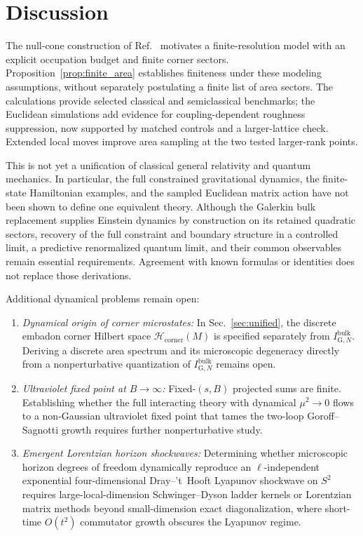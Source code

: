 \documentclass[onecolumn,11pt,aps,prd,amsmath,amssymb,nofootinbib,floatfix]{revtex4-2}
\newcommand{\calH}{\mathcal{H}}
\begin{document}
\section{Discussion}\label{sec:discussion}

The null-cone construction of Ref.~\cite{Chandrasekaran2026} motivates a finite-resolution model with an explicit occupation budget and finite corner sectors. Proposition~\ref{prop:finite_area} establishes finiteness under these modeling assumptions, without separately postulating a finite list of area sectors. The calculations provide selected classical and semiclassical benchmarks; the Euclidean simulations add evidence for coupling-dependent roughness suppression, now supported by matched controls and a larger-lattice check. Extended local moves improve area sampling at the two tested larger-rank points.

This is not yet a unification of classical general relativity and quantum mechanics. In particular, the full constrained gravitational dynamics, the finite-state Hamiltonian examples, and the sampled Euclidean matrix action have not been shown to define one equivalent theory. Although the Galerkin bulk replacement supplies Einstein dynamics by construction on its retained quadratic sectors, recovery of the full constraint and boundary structure in a controlled limit, a predictive renormalized quantum limit, and their common observables remain essential requirements. Agreement with known formulas or identities does not replace those derivations.

Additional dynamical problems remain open:
\begin{enumerate}
\item \emph{Dynamical origin of corner microstates:} In Sec.~\ref{sec:unified}, the discrete embadon corner Hilbert space $\calH_{\mathrm{corner}}(M)$ is specified separately from $I_{\mathrm{G},N}^{\mathrm{bulk}}$. Deriving a discrete area spectrum and its microscopic degeneracy directly from a nonperturbative quantization of $I_{\mathrm{G},N}^{\mathrm{bulk}}$ remains open.
\item \emph{Ultraviolet fixed point at $B\to\infty$:} Fixed-$(s,B)$ projected sums are finite. Establishing whether the full interacting theory with dynamical $\mu^2\to 0$ flows to a non-Gaussian ultraviolet fixed point that tames the two-loop Goroff--Sagnotti growth requires further nonperturbative study.
\item \emph{Emergent Lorentzian horizon shockwaves:} Determining whether microscopic horizon degrees of freedom dynamically reproduce an $\ell$-independent exponential four-dimensional Dray--'t~Hooft Lyapunov shockwave on $S^2$ requires large-local-dimension Schwinger--Dyson ladder kernels or Lorentzian matrix methods beyond small-dimension exact diagonalization, where short-time $O(t^2)$ commutator growth obscures the Lyapunov regime.
\end{enumerate}
\end{document}
